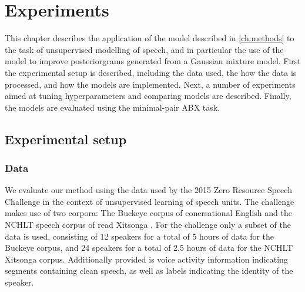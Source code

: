 %
%
%

\chapter{Experiments}
\label{ch:experiments}

This chapter describes the application of the model described in \cref{ch:methods} to the task of unsupervised modelling of speech, and in particular the use of the model to improve posteriorgrams generated from a Gaussian mixture model.
First the experimental setup is described, including the data used, the how the data is processed, and how the models are implemented.
Next, a number of experiments aimed at tuning hyperparameters and comparing models are described.
Finally, the models are evaluated using the minimal-pair ABX task.

\section{Experimental setup}
\subsection{Data}
We evaluate our method using the data used by the 2015 Zero Resource Speech Challenge in the context of unsupervised learning of speech units.
The challenge makes use of two corpora: The Buckeye corpus of conersational English \parencite{buckeyecorpus} and the NCHLT speech corpus of read Xitsonga \parencite{barnard2014nchlt}.
For the challenge only a subset of the data is used, consisting of 12 speakers for a total of 5 hours of data for the Buckeye corpus, and 24 speakers for a total of 2.5 hours of data for the NCHLT Xitsonga corpus.
Additionally provided is voice activity information indicating segments containing clean speech, as well as labels indicating the identity of the speaker.

